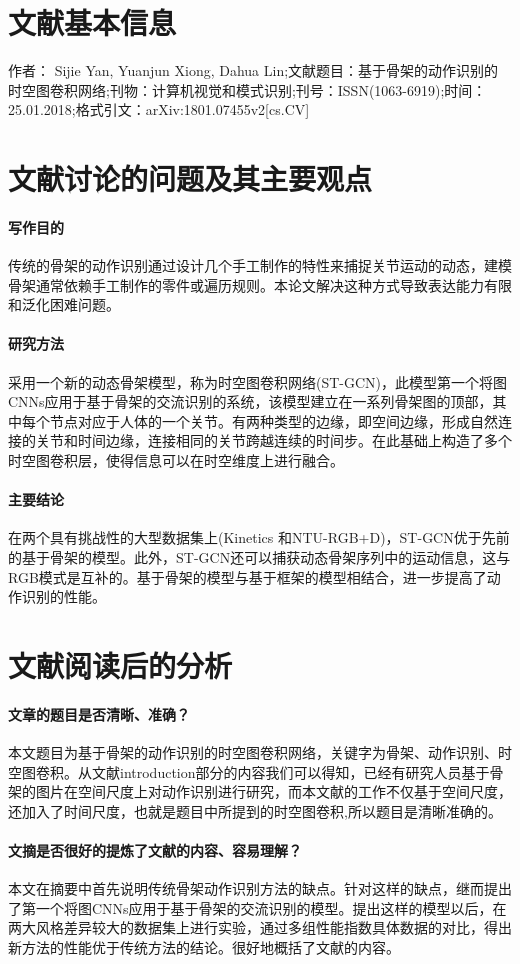 \documentclass[a4paper,12pt,onecolumn,songti]{article}
\begin{document}
 
	\section{文献基本信息}
	作者： Sijie Yan, Yuanjun Xiong, Dahua Lin;文献题目：基于骨架的动作识别的时空图卷积网络;刊物：计算机视觉和模式识别;刊号：ISSN(1063-6919);时间：25.01.2018;格式引文：arXiv:1801.07455v2[cs.CV]
	\section{文献讨论的问题及其主要观点}
		\paragraph{写作目的}
		传统的骨架的动作识别通过设计几个手工制作的特性来捕捉关节运动的动态，建模骨架通常依赖手工制作的零件或遍历规则。本论文解决这种方式导致表达能力有限和泛化困难问题。
		\paragraph{研究方法}
		采用一个新的动态骨架模型，称为时空图卷积网络(ST-GCN)，此模型第一个将图CNNs应用于基于骨架的交流识别的系统，该模型建立在一系列骨架图的顶部，其中每个节点对应于人体的一个关节。有两种类型的边缘，即空间边缘，形成自然连接的关节和时间边缘，连接相同的关节跨越连续的时间步。在此基础上构造了多个时空图卷积层，使得信息可以在时空维度上进行融合。
		\paragraph{主要结论}
		在两个具有挑战性的大型数据集上(Kinetics 和NTU-RGB+D)，ST-GCN优于先前的基于骨架的模型。此外，ST-GCN还可以捕获动态骨架序列中的运动信息，这与RGB模式是互补的。基于骨架的模型与基于框架的模型相结合，进一步提高了动作识别的性能。
	\section{文献阅读后的分析}
		\paragraph{文章的题目是否清晰、准确？}本文题目为基于骨架的动作识别的时空图卷积网络，关键字为骨架、动作识别、时空图卷积。从文献introduction部分的内容我们可以得知，已经有研究人员基于骨架的图片在空间尺度上对动作识别进行研究，而本文献的工作不仅基于空间尺度，还加入了时间尺度，也就是题目中所提到的时空图卷积,所以题目是清晰准确的。
		\paragraph{文摘是否很好的提炼了⽂献的内容、容易理解？}
		本文在摘要中首先说明传统骨架动作识别方法的缺点。针对这样的缺点，继而提出了第一个将图CNNs应用于基于骨架的交流识别的模型。提出这样的模型以后，在两大风格差异较大的数据集上进行实验，通过多组性能指数具体数据的对比，得出新方法的性能优于传统方法的结论。很好地概括了文献的内容。
\end{document}
